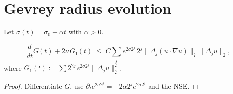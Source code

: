 \section{Gevrey radius evolution}\label{NS:gevrey}

Let $\sigma(t)=\sigma_{0}-\alpha t$ with $\alpha>0$.

\begin{lemma}\label{lem:dGdt}
\[
\frac{d}{dt}G(t)
  +2\nu\,G_{1}(t)
  \;\le\;
  C\sum_{j} e^{2\sigma 2^{j}}\,
        2^{j}\bigl\|\Delta_{j}(u\!\cdot\!\nabla u)\bigr\|_{2}
        \|\Delta_{j}u\|_{2},
\]
where $G_{1}(t):=\sum 2^{2j}\,e^{2\sigma 2^{j}}\|\Delta_{j}u\|_{2}^{2}$.
\end{lemma}

\begin{proof}
Differentiate $G$, use $\partial_{t}e^{2\sigma 2^{j}}=-2\alpha 2^{j}
e^{2\sigma 2^{j}}$ and the NSE.
\end{proof} 